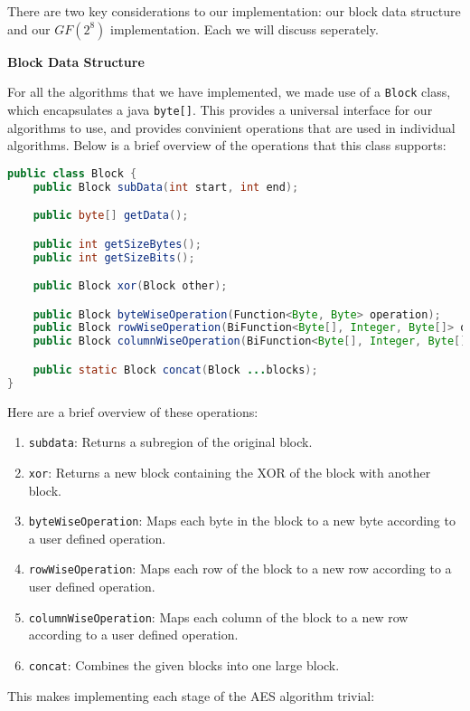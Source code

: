 There are two key considerations to our implementation: our block data structure and our $GF(2^8)$ implementation.
Each we will discuss seperately.

\textbf{Block Data Structure}

For all the algorithms that we have implemented, we made use of a \texttt{Block} class, which encapsulates a java 
\texttt{byte[]}. This provides a universal interface for our algorithms to use, and provides convinient operations 
that are used in individual algorithms. Below is a brief overview of the operations that this class supports:

\begin{lstlisting}[language=Java]
public class Block {
    public Block subData(int start, int end);

    public byte[] getData();

    public int getSizeBytes();
    public int getSizeBits();

    public Block xor(Block other);

    public Block byteWiseOperation(Function<Byte, Byte> operation);
    public Block rowWiseOperation(BiFunction<Byte[], Integer, Byte[]> operation);
    public Block columnWiseOperation(BiFunction<Byte[], Integer, Byte[]> operation);

    public static Block concat(Block ...blocks);
}
\end{lstlisting}

Here are a brief overview of these operations:
\begin{enumerate}
    \item \texttt{subdata}: Returns a subregion of the original block.
    \item \texttt{xor}: Returns a new block containing the XOR of the block with another block.
    \item \texttt{byteWiseOperation}: Maps each byte in the block to a new byte according to a user 
        defined operation.
    \item \texttt{rowWiseOperation}: Maps each row of the block to a new row according to a user
        defined operation.
    \item \texttt{columnWiseOperation}: Maps each column of the block to a new row according to a user
        defined operation.
    \item \texttt{concat}: Combines the given blocks into one large block.
\end{enumerate}

This makes implementing each stage of the AES algorithm trivial:

